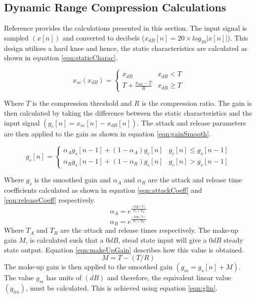 \documentclass[11pt,onecolumn]{witseiepaper}
\begin{document}
\begin{appendices}
\section{Dynamic Range Compression Calculations}
\label{app:compressCalc}

\noindent Reference \cite{compCalc} provides the calculations presented in this section. The input signal is sampled $(x[n])$ and converted to decibels ($x_{dB}[n] = 20\times log_{10}|x[n]|$). This design utilises a hard knee and hence, the static characteristics are calculated as shown in equation \ref{eqn:staticCharac}.

\begin{equation}
\label{eqn:staticCharac}
x_{sc}(x_{dB}) = 
\begin{cases} 
      x_{dB} & x_{dB} < T \\
     T + \frac{x_{dB} - T}{R} & x_{dB} \geq T
   \end{cases}
\end{equation}

\noindent Where $T$ is the compression threshold and $R$ is the compression ratio. The gain is then calculated by taking the difference between the static characteristics and the input signal $(g_c[n] = x_{sc}[n] - x_{dB}[n])$. The attack and release parameters are then applied to the gain as shown in equation \ref{eqn:gainSmooth}.

\begin{equation}
\label{eqn:gainSmooth}
g_s[n] = 
\begin{cases} 
      \alpha_A g_s[n-1] + (1-\alpha_A)g_c[n] & g_c[n] \leq g_s[n-1] \\
     \alpha_R g_s[n-1] + (1-\alpha_R)g_c[n] & g_c[n] > g_s[n-1]
   \end{cases}
\end{equation}

\noindent Where $g_s$ is the smoothed gain and $\alpha_A$ and $\alpha_R$ are the attack and release time coefficients calculated as shown in equation \ref{eqn:attackCoeff} and \ref{eqn:releaseCoeff} respectively.
%
\begin{equation}
\label{eqn:attackCoeff}
\alpha_A = e^{\frac{-log(9)}{F_s\times T_A}}
\end{equation}
%
\begin{equation}
\label{eqn:releaseCoeff}
\alpha_R = e^{\frac{-log(9)}{F_s\times T_R}}
\end{equation}
%
\noindent Where $T_A$ and $T_R$ are the attack and release times respectively. The make-up gain $M$, is calculated such that a $0dB$, stead state input will give a $0dB$ steady state output. Equation \ref{eqn:makeUpGain} describes how this value is obtained.
%
\begin{equation}
\label{eqn:makeUpGain}
M = T - (T/R)
\end{equation}
%
\noindent The make-up gain is then applied to the smoothed gain $(g_m = g_s[n] + M)$. The value $g_m$ has units of $(dB)$ and therefore, the equivalent linear value $(g_{lin})$, must be calculated. This is achieved using equation \ref{eqn:glin}.


\end{appendices}
\end{document}
